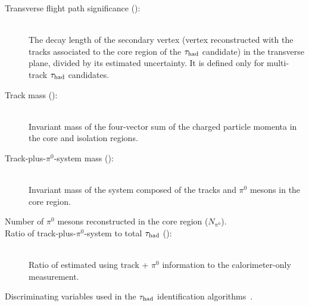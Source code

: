 \begin{description}
    \item[Transverse flight path significance (\transFlightSig{}):] \hfill \\ 
      The decay length of the secondary vertex (vertex reconstructed with the tracks associated to the core region of the $\tau_\text{had}$ candidate) in the transverse plane, divided by its estimated uncertainty. It is defined only for multi-track $\tau_\text{had}$ candidates.
      
    \item[Track mass (\trackMass{}):] \hfill \\ 
      Invariant mass of the four-vector sum of the charged particle momenta in the core and isolation regions.
      
    \item[Track-plus-$\pi^0$-system mass (\trackPizeroMass{}):] \hfill \\ 
      Invariant mass of the system composed of the tracks and $\pi^0$ mesons in the core region.
      
    \item[Number of $\pi^0$ mesons reconstructed in the core region ($N_{\mathrm{\pi^0} } $).] \hfill 
      
    \item[Ratio of track-plus-$\pi^0$-system \pt{} to total $\tau_\text{had}$ \pt{} (\Etratio{}): ] \hfill \\ 
      Ratio of estimated \pt{} using track + $\pi^0$ information to the calorimeter-only measurement.
      
\end{description}

\begin{table}[bp] 
  \centering
  \renewcommand{\arraystretch}{1.4}
  \caption{Discriminating variables used in the $\tau_\text{had}$ identification algorithms~\cite{PERF-2013-06}.}
  
  \label{tab:taus-idvars}
\end{table}


